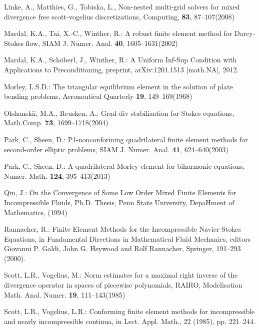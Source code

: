 \documentclass[12pt,showkeys]{amsart}
\begin{document}
\begin{thebibliography}{000}
\newblock Linke, A., Matthies, G., Tobiska, L., 
\rm{Non-nested multi-grid solvers for mixed divergence free scott-vogelius discretizations}, Computing, \textbf{83}, 87--107(2008)

\newblock Mardal, K.A., Tai, X.-C., Winther, R.: 
\rm{A robust finite element method for Darcy-Stokes flow}, SIAM J. Numer. Anal. \textbf{40}, 1605--1631(2002)

\newblock Mardal, K.A., Sch\"oberl, J., Winther, R.: 
\rm{A Uniform Inf-Sup Condition with Applications to Preconditioning}, preprint, arXiv:1201.1513 [math.NA], 2012.

Morley, L.S.D.:
\rm{The triangular equilibrium element in the solution of plate bending problems}, Aeronautical Quarterly \textbf{19}, 149--169(1968)

\newblock Olshanskii, M.A., Reusken, A.: 
\rm{Grad-div stabilization for Stokes equations}, Math.Comp. \textbf{73}, 1699--1718(2004)

\newblock Park, C., Sheen, D.: 
\rm{P1-nonconforming quadrilateral finite element methods for second-order elliptic problems}, SIAM J. Numer. Anal. \textbf{41}, 624--640(2003)

\newblock Park, C., Sheen, D.:
\rm{A quadrilateral Morley element for biharmonic equations}, Numer. Math. \textbf{124}, 395--413(2013)

\newblock Qin, J.: 
\rm{On the Convergence of Some Low Order Mixed Finite Elements for Incompressible Fluids}, Ph.D. Thesis, Penn State University, DepaHment of Mathematics, (1994)

\newblock Rannacher, R.:
\rm{Finite Element Methods for the Incompressible Navier-Stokes Equations}, in Fundamental Directions in Mathematical Fluid Mechanics, editors Giovanni P. Galdi, John G. Heywood and Rolf Rannacher,  Springer, 191--293 (2000).

\newblock Scott, L.R., Vogelius, M.: 
\rm{Norm estimates for a maximal right inverse of the divergence operator in spaces of piecewise polynomials}, RAIRO, Modelisation Math. Anal. Numer. \textbf{19}, 111--143(1985)

\newblock Scott, L.R., Vogelius, L.R.: 
\rm{Conforming finite element methods for incompressible and nearly incompressible continua}, in Lect. Appl. Math., 22 (1985), pp. 221--244.


\end{thebibliography}
\end{document}
